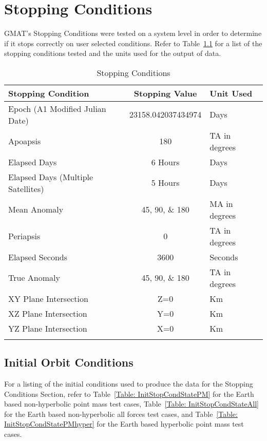 \chapter{Stopping Conditions}
\label{Ch:StopCond}

GMAT's Stopping Conditions were tested on a system level in order to
determine if it stops correctly on user selected conditions. Refer
to Table~\ref{Table: InitStopCond} for a list of the stopping
conditions tested and the units used for the output of data.

\begin{table}[htbp!]
\centering \caption{Stopping Conditions}
      \begin{tabular}{lcl}
      \hline\hline
         Stopping Condition & Stopping Value & Unit Used\\
         \hline
         Epoch (A1 Modified Julian Date) & 23158.042037434974 & Days\\
         Apoapsis & 180 & TA in degrees\\
         Elapsed Days & 6 Hours & Days\\
         Elapsed Days (Multiple Satellites) & 5 Hours & Days\\
         Mean Anomaly & 45, 90, \& 180 & MA in degrees\\
         Periapsis & 0 & TA in degrees\\
         Elapsed Seconds & 3600 & Seconds\\
         True Anomaly & 45, 90, \& 180 & TA in degrees\\
         XY Plane Intersection & Z=0 & Km\\
         XZ Plane Intersection & Y=0 & Km\\
         YZ Plane Intersection & X=0 & Km\\
      \hline\hline
      \label{Table: InitStopCond}
\end{tabular}
\end{table}

\clearpage
\section{Initial Orbit Conditions}
For a listing of the initial conditions used to produce the data for
the Stopping Conditions Section, refer to Table~\ref{Table:
InitStopCondStatePM} for the Earth based non-hyperbolic point mass
test cases, Table~\ref{Table: InitStopCondStateAll} for the Earth
based non-hyperbolic all forces test cases, and Table~\ref{Table:
InitStopCondStatePMhyper} for the Earth based hyperbolic point mass
test cases.

